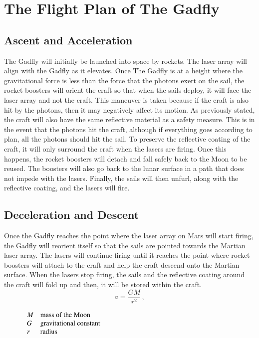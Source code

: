 \documentclass{aa}
\begin{document}
\section{The Flight Plan of The Gadfly}
\subsection{Ascent and Acceleration}
    The Gadfly will initially be launched into space by rockets. The laser array will align with the Gadfly as it elevates. Once The Gadfly is at a height where the gravitational force is less than the force that the photons exert on the sail, the rocket boosters will orient the craft so that when the sails deploy, it will face the laser array and not the craft. This maneuver is taken because if the craft is also hit by the photons, then it may negatively affect its motion. As previously stated, the craft will also have the same reflective material as a safety measure. This is in the event that the photons hit the craft, although if everything goes according to plan, all the photons should hit the sail. To preserve the reflective coating of the craft, it will only surround the craft when the lasers are firing. Once this happens, the rocket boosters will detach and fall safely back to the Moon to be reused. The boosters will also go back to the lunar surface in a path that does not impede with the lasers. Finally, the sails will then unfurl, along with the reflective coating, and the lasers will fire. 
\subsection{Deceleration and Descent}
    Once the Gadfly reaches the point where the laser array on Mars will start firing, the Gadfly will reorient itself so that the sails are pointed towards the Martian laser array. The lasers will continue firing until it reaches the point where rocket boosters will attach to the craft and help the craft descend onto the Martian surface. When the lasers stop firing, the sails and the reflective coating around the craft will fold up and then, it will be stored within the craft. 
 \begin{equation}
      a = \frac{GM}{r^{\mathrm{2}}}  \,,
   \end{equation}

\[
      \begin{array}{lp{0.8\linewidth}}
         M  & mass of the Moon     \\
         G               & gravitational constant                    \\
         r             & radius 
 \end{array}
   \]
\end{document}
